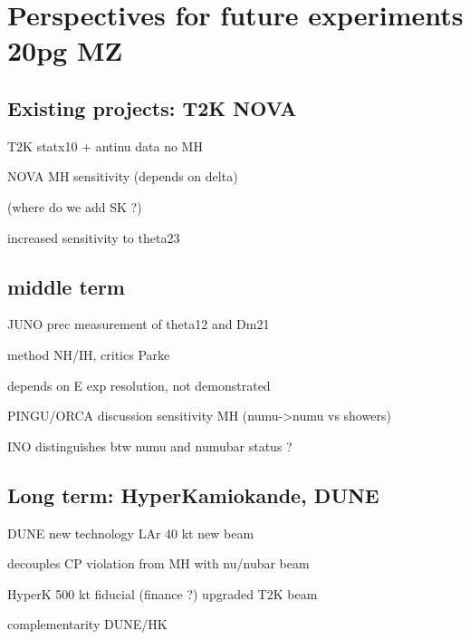 \section{Perspectives for future experiments 20pg MZ}
\label{sec:future}


\subsection{Existing projects: T2K NOVA}

T2K statx10 + antinu data no MH

NOVA MH sensitivity (depends on delta)

(where do we add  SK ?)

increased sensitivity to theta23


\subsection{middle term}

JUNO prec measurement of theta12 and Dm21

method NH/IH, critics Parke

depends on E exp resolution, not demonstrated

PINGU/ORCA discussion sensitivity MH (numu->numu vs showers)

INO distinguishes btw numu and numubar status ? 


\subsection{Long term: HyperKamiokande, DUNE}

DUNE new technology LAr 40 kt new beam

decouples CP violation from MH with nu/nubar beam

HyperK 500 kt fiducial (finance ?) upgraded T2K beam

complementarity DUNE/HK